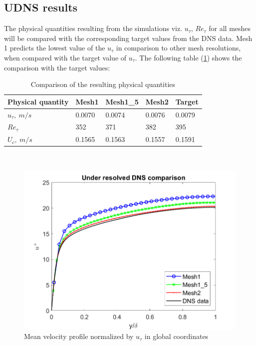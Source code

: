 \subsection{UDNS results}
The physical quantities resulting from the simulations viz. $u_\tau$, $Re_\tau$ for all meshes will be compared with the corresponding target values from the DNS data. Mesh 1 predicts the lowest value of the $u_\tau$ in comparison to other mesh resolutions, when compared with the target value of $u_\tau$.  The following table (\ref{Global quantities}) shows the comparison with the target values:
%
\begin{table}[h!]
\begin{center}
\begin{tabular}{ p{3cm}|p{1.5cm}p{1.5cm}p{1.5cm}p{1.5cm}  } 
\hline
Physical quantity & Mesh1 & Mesh1\_5 & Mesh2 & Target \\
  \hline
  \multirow{1}{6em}{$u_\tau,\ m/s$}  & 0.0070 & 0.0074 & 0.0076 & 0.0079\\
  \hline
  \multirow{1}{6em}{$Re_\tau$} & 352 & 371 & 382 & 395\\
  \hline
  \multirow{1}{6em}{$U_c,\ m/s$} & 0.1565 & 0.1563 & 0.1557 & 0.1591\\
  \hline
\end{tabular}
\end{center}
\caption{Comparison of the resulting physical quantities}
\label{Global quantities}
\end{table}\\
%
\begin{figure}[t]
    \centering
    \includegraphics[width=1\textwidth]{06_Resultsanddiscussion/figur/UDNS_2016/Profile_global_coords.png}
    \caption{Mean velocity profile normalized by $u_\tau$ in global coordinates}
    \label{Mean velocity global}
\end{figure}

